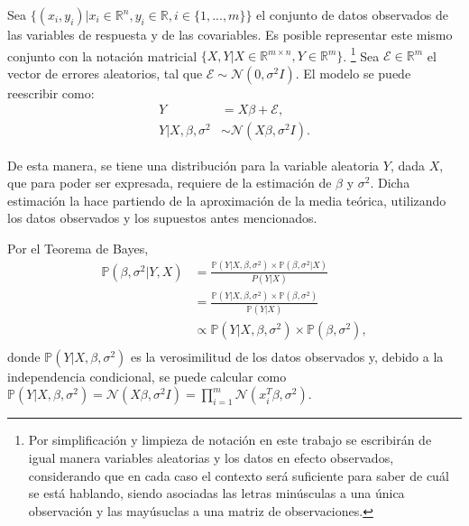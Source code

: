 Sea $\{(x_i,y_i)| x_i \in \mathbb{R}^n, y_i \in \mathbb{R}, i \in \{1,...,m\} \}$ el conjunto de datos observados de las variables de respuesta y de las covariables. Es posible representar este mismo conjunto con la notaci\'on matricial $\{X,Y | X \in \mathbb{R}^{m \times n}, Y \in \mathbb{R}^m\}$. \footnote{Por simplificaci\'on y limpieza de notaci\'on en este trabajo se escribir\'an de igual manera variables aleatorias y los datos en efecto observados, considerando que en cada caso el contexto ser\'a suficiente para saber de cu\'al se est\'a hablando, siendo asociadas las letras min\'usculas a una \'unica observaci\'on y las may\'usuclas a una matriz de observaciones.} Sea $\mathcal{E} \in \mathbb{R}^m$ el vector de errores aleatorios, tal que $\mathcal{E} \sim \mathcal{N}(0,\sigma^2 I)$. El modelo se puede reescribir como:
\begin{equation*}
\begin{aligned}
    Y &= X\beta + \mathcal{E}, \\
    Y|X,\beta,\sigma^2 &\sim \mathcal{N}(X\beta,\sigma^2 I).
\end{aligned}
\end{equation*}

De esta manera, se tiene una distribuci\'on para la variable aleatoria $Y$, dada $X$, que para poder ser expresada, requiere de la estimaci\'on de $\beta$ y $\sigma^2$. Dicha estimaci\'on la hace partiendo de la aproximaci\'on de la media te\'orica, utilizando los datos observados y los supuestos antes mencionados.

Por el Teorema de Bayes,
\begin{equation*}
\begin{aligned}
    \mathbb{P}(\beta,\sigma^2 | Y, X) 
    &= \frac{\mathbb{P}(Y| X, \beta, \sigma^2) \times \mathbb{P}(\beta, \sigma^2 | X)}{P(Y | X)} \\
    &= \frac{\mathbb{P}(Y| X, \beta, \sigma^2) \times \mathbb{P}(\beta, \sigma^2)}{\mathbb{P}(Y | X)} \\
    &\propto \mathbb{P}(Y| X, \beta, \sigma^2) \times \mathbb{P}(\beta, \sigma^2), \\
\end{aligned}
\end{equation*}
donde $\mathbb{P}(Y| X, \beta, \sigma^2)$ es la verosimilitud de los datos observados y, debido a la independencia condicional, se puede calcular como $\mathbb{P}(Y| X, \beta, \sigma^2) = \mathcal{N}(X\beta,\sigma^2 I) = \prod_{i=1}^m \mathcal{N}(x_i^T\beta,\sigma^2)$. 

